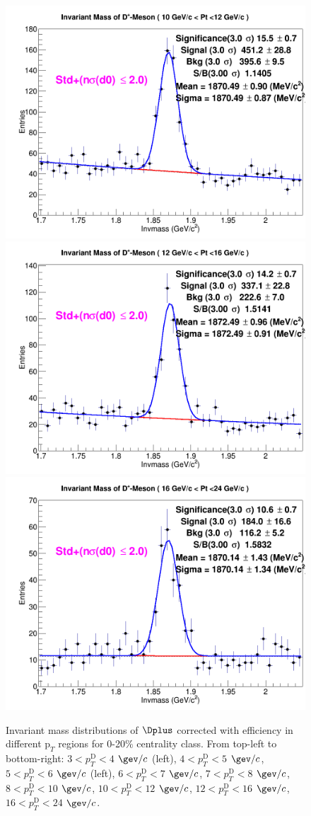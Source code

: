 \begin{figure}[!htp]
{\includegraphics[width=0.3\linewidth]{Centrality_DPlus/Dplus/Cmp_Prompt/ZNA/0_20/DplusMassPlots/1Dhist_DplusMass_12OCT16_pT_bin9.png}}
{\includegraphics[width=0.3\linewidth]{Centrality_DPlus/Dplus/Cmp_Prompt/ZNA/0_20/DplusMassPlots/1Dhist_DplusMass_12OCT16_pT_bin10.png}}
{\includegraphics[width=0.3\linewidth]{Centrality_DPlus/Dplus/Cmp_Prompt/ZNA/0_20/DplusMassPlots/1Dhist_DplusMass_12OCT16_pT_bin11.png}}

\caption{Invariant mass distributions of $\Dplus$ corrected with efficiency in different $\text{p}_T$ regions for 0-20$\%$ centrality class. From top-left to bottom-right: $3< p_{T}^{\text{D}}< 4$ $\gev/c$ (left), $4< p_{T}^{\text{D}}< 5$ $\gev/c$, $5< p_{T}^{\text{D}}< 6$ $\gev/c$ (left), $6 < p_{T}^{\text{D}} < 7$ $\gev/c$, $7< p_{T}^{\text{D}}< 8$ $\gev/c$, $8< p_{T}^{\text{D}}< 10$ $\gev/c$, $10< p_{T}^{\text{D}}< 12$ $\gev/c$, $12 < p_{T}^{\text{D}}< 16$ $\gev/c$, $16<p_{T}^{\text{D}}< 24$ $\gev/c$.}
\label{fig:InvMassDplus020}
\end{figure}

